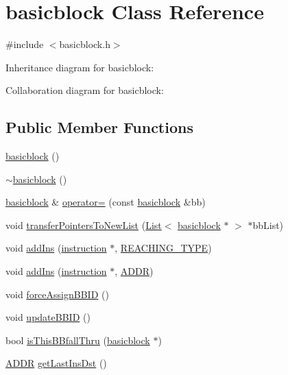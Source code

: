 \hypertarget{classbasicblock}{
\section{basicblock Class Reference}
\label{classbasicblock}
}


{\ttfamily \#include $<$basicblock.h$>$}



Inheritance diagram for basicblock:


Collaboration diagram for basicblock:
\subsection*{Public Member Functions}
\begin{DoxyCompactItemize}
\item 
\hyperlink{classbasicblock_ac6d735b981c1d367ad93f62ab0394974}{basicblock} ()
\item 
\hyperlink{classbasicblock_a9825a2fafc3b7203bdfe2b0da687bf7d}{$\sim$basicblock} ()
\item 
\hyperlink{classbasicblock}{basicblock} \& \hyperlink{classbasicblock_a7fee16556188be2c9501c1062589e7a6}{operator=} (const \hyperlink{classbasicblock}{basicblock} \&bb)
\item 
void \hyperlink{classbasicblock_a8f58f53b0f1ab88f2909116193cfa953}{transferPointersToNewList} (\hyperlink{classList}{List}$<$ \hyperlink{classbasicblock}{basicblock} $\ast$ $>$ $\ast$bbList)
\item 
void \hyperlink{classbasicblock_a21556bff8a285d4098ce0762a1d9b69f}{addIns} (\hyperlink{classinstruction}{instruction} $\ast$, \hyperlink{basicblock_8h_ad7598ead73b3381457b65e7370c3d2fe}{REACHING\_\-TYPE})
\item 
void \hyperlink{classbasicblock_a3bf11ce1881fbbbd5697888543c5a267}{addIns} (\hyperlink{classinstruction}{instruction} $\ast$, \hyperlink{binaryTranslator_2global_8h_a8bb6b77b3aab51e3a8d1866dd5861225}{ADDR})
\item 
void \hyperlink{classbasicblock_ae4243cd796c3c03447b58d6fdd2743a5}{forceAssignBBID} ()
\item 
void \hyperlink{classbasicblock_a14279cf8fb23e94f8cd03f8aeacbde21}{updateBBID} ()
\item 
bool \hyperlink{classbasicblock_ac0ddcb18b5f613710d5836025dd974cb}{isThisBBfallThru} (\hyperlink{classbasicblock}{basicblock} $\ast$)
\item 
\hyperlink{binaryTranslator_2global_8h_a8bb6b77b3aab51e3a8d1866dd5861225}{ADDR} \hyperlink{classbasicblock_a5c04fc7ec170aa4d395928b7c4ca0392}{getLastInsDst} ()

\end{DoxyCompactItemize}

